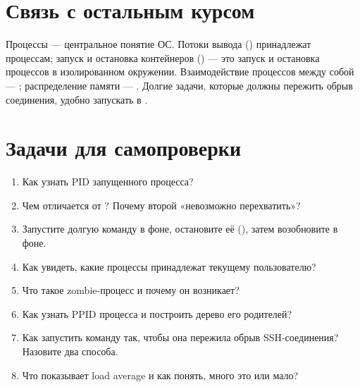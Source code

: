 \section{Связь с остальным курсом}

Процессы --- центральное понятие ОС. Потоки вывода
() принадлежат процессам;
запуск и остановка контейнеров
() --- это запуск и
остановка процессов в изолированном окружении.
Взаимодействие процессов между собой ---
; распределение памяти ---
. Долгие задачи, которые
должны пережить обрыв соединения, удобно запускать в
.

\section{Задачи для самопроверки}
\begin{enumerate}
  \item Как узнать PID запущенного процесса?
  \item Чем  отличается от ?
    Почему второй «невозможно перехватить»?
  \item Запустите долгую команду в фоне, остановите её
    (), затем возобновите в фоне.
  \item Как увидеть, какие процессы принадлежат текущему
    пользователю?
  \item Что такое zombie-процесс и почему он возникает?
  \item Как узнать PPID процесса и построить дерево его
    родителей?
  \item Как запустить команду так, чтобы она пережила обрыв
    SSH-соединения? Назовите два способа.
  \item Что показывает load average и как понять, много это
    или мало?
\end{enumerate}
